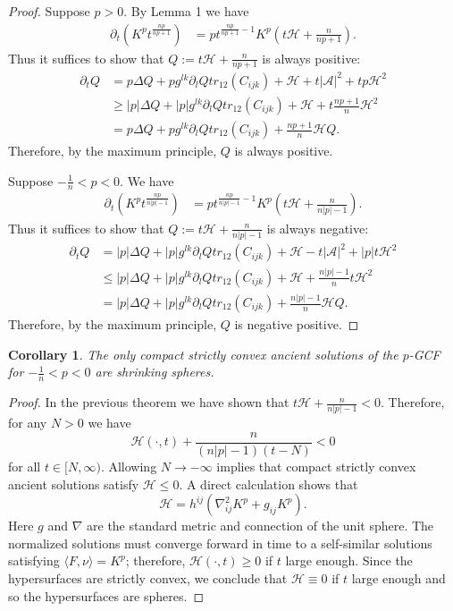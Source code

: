 \documentclass{amsart}
\newtheorem{corollary}[theorem]{Corollary}
\theoremstyle{definition}
\theoremstyle{remark}
\numberwithin{equation}{section}
\begin{document}
\begin{proof}
Suppose $p>0.$
By Lemma 1 we have
\begin{align*}
\partial_t \left(K^{ p }t^{\frac{n p }{n p +1}}\right)&= p  t^{\frac{n p }{n p +1}-1}K^{ p }\left(t\mathcal{H}+\frac{n}{n p +1}\right).
\end{align*}
Thus it suffices to show that $Q:=t\mathcal{H}+\frac{n}{n p +1}$ is always positive:
\begin{align*}
\partial_t Q&= p\Delta Q+ p  g^{lk}\partial_lQ tr_{12}( C _{ijk})+\mathcal{H}+t|\mathcal{A}|^2+  tp \mathcal{H}^2\\
&\geq  |p| \Delta Q+ |p|  g^{lk}\partial_lQ tr_{12}( C _{ijk})+\mathcal{H}+t\frac{n p +1}{n} \mathcal{H}^2\\
&= p \Delta Q+ p  g^{lk}\partial_lQ tr_{12}( C _{ijk})+\frac{n p +1}{n}\mathcal{H}Q.
\end{align*}
Therefore, by the maximum principle, $Q$ is always positive.


Suppose $-\frac{1}{n}<p<0.$ We have
\begin{align*}
\partial_t \left(K^{ p }t^{\frac{n p }{n |p| -1}}\right)&= p  t^{\frac{n p }{n |p| -1}-1}K^{ p }\left(t\mathcal{H}+\frac{n}{n |p| -1}\right).
\end{align*}
Thus it suffices to show that $Q:=t\mathcal{H}+\frac{n}{n |p| -1}$ is always negative:
\begin{align*}
\partial_t Q&= |p| \Delta Q+ |p|  g^{lk}\partial_lQ tr_{12}( C _{ijk})+\mathcal{H}-t|\mathcal{A}|^2+ |p|  t \mathcal{H}^2\\
&\leq  |p| \Delta Q+ |p|  g^{lk}\partial_lQ tr_{12}( C _{ijk})+\mathcal{H}+\frac{n |p| -1}{n}t \mathcal{H}^2\\
&= |p| \Delta Q+ |p|  g^{lk}\partial_lQ tr_{12}( C _{ijk})+\frac{n |p| -1}{n}\mathcal{H}Q.
\end{align*}
Therefore, by the maximum principle, $Q$ is negative positive.
\end{proof}
\begin{corollary}
The only compact strictly convex ancient solutions of the $p$-GCF for $-\frac{1}{n}<p<0$ are shrinking spheres.
\end{corollary}
\begin{proof}
In the previous theorem we have shown 
that $t\mathcal{H}+\frac{n}{n |p| -1}<0$. Therefore, for any $N>0$ we have
\[\mathcal{H}(\cdot,t)+\frac{n}{(n |p| -1)(t-N)}<0\]
for all $t\in [N,\infty).$
Allowing $N\to -\infty$ implies that compact strictly convex ancient solutions satisfy $\mathcal{H}\leq 0.$ A direct calculation shows that
\[\mathcal{H}=h^{ij}(\nabla_{ij}^2K^p+g_{ij}K^{p}).\]
Here $g$ and $\nabla$ are the standard metric and connection of the unit sphere. The normalized solutions must converge forward in time to a self-similar solutions satisfying $\langle F,\nu \rangle=K^{p}$; therefore, $\mathcal{H}(\cdot,t)\geq 0$ if $t$ large enough. Since the hypersurfaces are strictly convex, we conclude that  $\mathcal{H}\equiv 0$ if $t$ large enough and so the hypersurfaces are spheres.
\end{proof}
\end{document}
